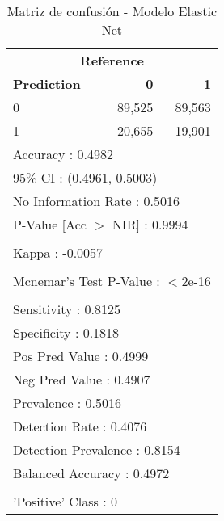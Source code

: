 \begin{table}[htbp]
\centering
\caption{Matriz de confusión - Modelo Elastic Net}
\label{tab:12_matriz_elastic_net}
\begin{tabular}{lrr}
\toprule
\multicolumn{3}{c}{\textbf{Reference}} \\
\textbf{Prediction} & \textbf{0} & \textbf{1} \\
\midrule
0 & 89,525 & 89,563 \\
1 & 20,655 & 19,901 \\
\midrule
\multicolumn{3}{l}{Accuracy : 0.4982} \\
\multicolumn{3}{l}{95\% CI : (0.4961, 0.5003)} \\
\multicolumn{3}{l}{No Information Rate : 0.5016} \\
\multicolumn{3}{l}{P-Value [Acc $>$ NIR] : 0.9994} \\
\\
\multicolumn{3}{l}{Kappa : -0.0057} \\
\\
\multicolumn{3}{l}{Mcnemar's Test P-Value : $<$2e-16} \\
\\
\multicolumn{3}{l}{Sensitivity : 0.8125} \\
\multicolumn{3}{l}{Specificity : 0.1818} \\
\multicolumn{3}{l}{Pos Pred Value : 0.4999} \\
\multicolumn{3}{l}{Neg Pred Value : 0.4907} \\
\multicolumn{3}{l}{Prevalence : 0.5016} \\
\multicolumn{3}{l}{Detection Rate : 0.4076} \\
\multicolumn{3}{l}{Detection Prevalence : 0.8154} \\
\multicolumn{3}{l}{Balanced Accuracy : 0.4972} \\
\\
\multicolumn{3}{l}{'Positive' Class : 0} \\
\bottomrule
\end{tabular}
\end{table}